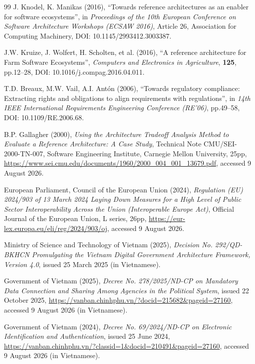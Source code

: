 \begin{thebibliography}{99}
J. Knodel, K. Manikas (2016), ``Towards reference architectures as an enabler for software ecosystems'', in \textit{Proceedings of the 10th European Conference on Software Architecture Workshops (ECSAW 2016)}, Article 26, Association for Computing Machinery, DOI: 10.1145/2993412.3003387.

J.W. Kruize, J. Wolfert, H. Scholten, et al. (2016), ``A reference architecture for Farm Software Ecosystems'', \textit{Computers and Electronics in Agriculture}, \textbf{125}, pp.12--28, DOI: 10.1016/j.compag.2016.04.011.

T.D. Breaux, M.W. Vail, A.I. Ant\'on (2006), ``Towards regulatory compliance: Extracting rights and obligations to align requirements with regulations'', in \textit{14th IEEE International Requirements Engineering Conference (RE'06)}, pp.49--58, DOI: 10.1109/RE.2006.68.

B.P. Gallagher (2000), \textit{Using the Architecture Tradeoff Analysis Method to Evaluate a Reference Architecture: A Case Study}, Technical Note CMU/SEI-2000-TN-007, Software Engineering Institute, Carnegie Mellon University, 25pp, \url{https://www.sei.cmu.edu/documents/1960/2000_004_001_13679.pdf}, accessed 9 August 2026.

European Parliament, Council of the European Union (2024), \textit{Regulation (EU) 2024/903 of 13 March 2024 Laying Down Measures for a High Level of Public Sector Interoperability Across the Union (Interoperable Europe Act)}, Official Journal of the European Union, L series, 26pp, \url{https://eur-lex.europa.eu/eli/reg/2024/903/oj}, accessed 9 August 2026.

Ministry of Science and Technology of Vietnam (2025), \textit{Decision No. 292/QD-BKHCN Promulgating the Vietnam Digital Government Architecture Framework, Version 4.0}, issued 25 March 2025 (in Vietnamese).

Government of Vietnam (2025), \textit{Decree No. 278/2025/ND-CP on Mandatory Data Connection and Sharing Among Agencies in the Political System}, issued 22 October 2025, \url{https://vanban.chinhphu.vn/?docid=215682&pageid=27160}, accessed 9 August 2026 (in Vietnamese).

Government of Vietnam (2024), \textit{Decree No. 69/2024/ND-CP on Electronic Identification and Authentication}, issued 25 June 2024, \url{https://vanban.chinhphu.vn/?classid=1&docid=210491&pageid=27160}, accessed 9 August 2026 (in Vietnamese).


\end{thebibliography}
